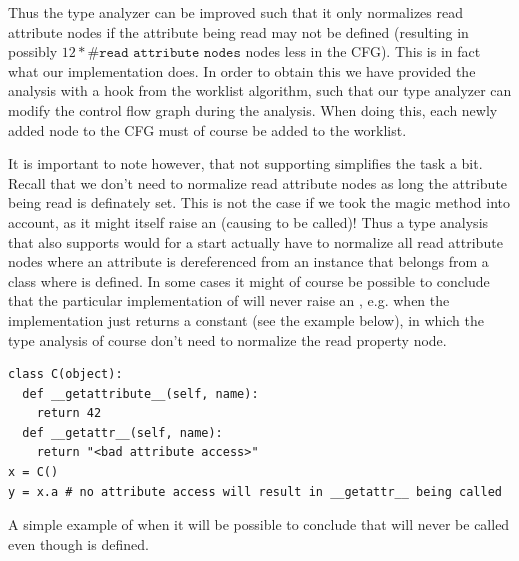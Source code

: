 Thus the type analyzer can be improved such that it only normalizes read attribute nodes if the attribute being read may not be defined (resulting in possibly $12 * \#\texttt{read attribute nodes}$ nodes less in the CFG). This is in fact what our implementation does. In order to obtain this we have provided the analysis with a hook from the worklist algorithm, such that our type analyzer can modify the control flow graph during the analysis. When doing this, each newly added node to the CFG must of course be added to the worklist.

It is important to note however, that not supporting  simplifies the task a bit. Recall that we don't need to normalize read attribute nodes as long the attribute being read is definately set. This is not the case if we took the magic method  into account, as it might itself raise an  (causing  to be called)! Thus a type analysis that also supports  would for a start actually have to normalize all read attribute nodes where an attribute is dereferenced from an instance that belongs from a class where  is defined. In some cases it might of course be possible to conclude that the particular implementation of  will never raise an , e.g. when the implementation just returns a constant (see the example below), in which the type analysis of course don't need to normalize the read property node.

\begin{listing}[H]
	\begin{verbatim}
class C(object):
  def __getattribute__(self, name):
    return 42
  def __getattr__(self, name):
    return "<bad attribute access>"
x = C()
y = x.a # no attribute access will result in __getattr__ being called
	\end{verbatim}
	\caption{A simple example of when it will be possible to conclude that  will never be called even though  is defined.}
	\label{code:MagicMethods2}
\end{listing}